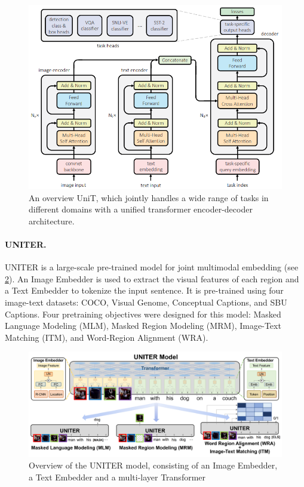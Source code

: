 \begin{figure}[ht]
    \centering
    \includegraphics[width=\linewidth]{images/models/unit.png}
    \caption{An overview UniT, which jointly handles a wide range of tasks in different domains with a unified transformer encoder-decoder architecture.}
    \label{fig:unit}
\end{figure}

\paragraph{UNITER.} UNITER \cite{chen2020uniter} is a large-scale pre-trained model for joint multimodal embedding (see \cref{fig:uniter}). An Image Embedder is used to extract the visual features of each region and a Text Embedder to tokenize the input sentence. It is pre-trained using four image-text datasets: COCO, Visual Genome, Conceptual Captions, and SBU Captions. Four pretraining objectives were designed for this model: Masked Language Modeling (MLM), Masked Region Modeling (MRM), Image-Text Matching (ITM), and Word-Region Alignment (WRA).

\begin{figure}[ht]
    \centering
    \includegraphics[width=\linewidth]{images/models/uniter.png}
    \caption{Overview of the UNITER model, consisting of an Image Embedder, a Text Embedder and a multi-layer Transformer}
    \label{fig:uniter}
\end{figure}

